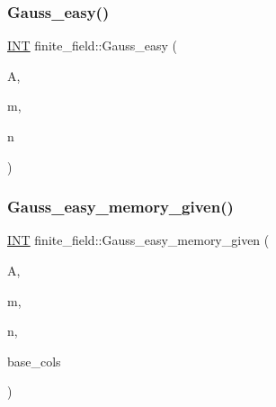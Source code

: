 \mbox{\label{classfinite__field_a32761bf6c4a41f24b7193352127db8e7}} 
\subsubsection{\texorpdfstring{Gauss\+\_\+easy()}{Gauss\_easy()}}
{\footnotesize\ttfamily \mbox{\hyperlink{galois_8h_a09fddde158a3a20bd2dcadb609de11dc}{I\+NT}} finite\+\_\+field\+::\+Gauss\+\_\+easy (\begin{DoxyParamCaption}\item[{\mbox{\hyperlink{galois_8h_a09fddde158a3a20bd2dcadb609de11dc}{I\+NT}} $\ast$}]{A,  }\item[{\mbox{\hyperlink{galois_8h_a09fddde158a3a20bd2dcadb609de11dc}{I\+NT}}}]{m,  }\item[{\mbox{\hyperlink{galois_8h_a09fddde158a3a20bd2dcadb609de11dc}{I\+NT}}}]{n }\end{DoxyParamCaption})}

\mbox{\label{classfinite__field_a145e894f8b6b16545fdc6c9ee027a3f0}} 
\subsubsection{\texorpdfstring{Gauss\+\_\+easy\+\_\+memory\+\_\+given()}{Gauss\_easy\_memory\_given()}}
{\footnotesize\ttfamily \mbox{\hyperlink{galois_8h_a09fddde158a3a20bd2dcadb609de11dc}{I\+NT}} finite\+\_\+field\+::\+Gauss\+\_\+easy\+\_\+memory\+\_\+given (\begin{DoxyParamCaption}\item[{\mbox{\hyperlink{galois_8h_a09fddde158a3a20bd2dcadb609de11dc}{I\+NT}} $\ast$}]{A,  }\item[{\mbox{\hyperlink{galois_8h_a09fddde158a3a20bd2dcadb609de11dc}{I\+NT}}}]{m,  }\item[{\mbox{\hyperlink{galois_8h_a09fddde158a3a20bd2dcadb609de11dc}{I\+NT}}}]{n,  }\item[{\mbox{\hyperlink{galois_8h_a09fddde158a3a20bd2dcadb609de11dc}{I\+NT}} $\ast$}]{base\+\_\+cols }\end{DoxyParamCaption})}

